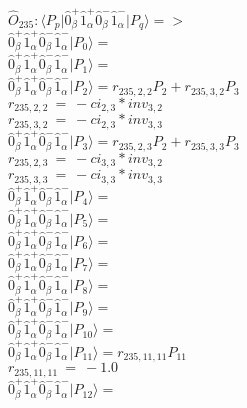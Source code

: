 \documentclass[14pt]{article}
\begin{document}
    $\hat{O}_{235}:  \langle{P_p}\vert \hat{0}_{\beta}^{+}\hat{1}_{\alpha}^{+}\hat{0}_{\beta}^{-}\hat{1}_{\alpha}^{-} \vert{P_q}\rangle => $ \\ 
    $ \hat{0}_{\beta}^{+}\hat{1}_{\alpha}^{+}\hat{0}_{\beta}^{-}\hat{1}_{\alpha}^{-} \vert{P_{0}}\rangle =  $ \\ 
    $ \hat{0}_{\beta}^{+}\hat{1}_{\alpha}^{+}\hat{0}_{\beta}^{-}\hat{1}_{\alpha}^{-} \vert{P_{1}}\rangle =  $ \\ 
    $ \hat{0}_{\beta}^{+}\hat{1}_{\alpha}^{+}\hat{0}_{\beta}^{-}\hat{1}_{\alpha}^{-} \vert{P_{2}}\rangle = {r}_{235,2,2}P_{2}+{r}_{235,3,2}P_{3} $ \\ 
    ${r}_{235,2,2}\ =\ -{ci}_{2,3}*{inv}_{3,2} $ \\ 
    ${r}_{235,3,2}\ =\ -{ci}_{2,3}*{inv}_{3,3} $ \\ 
    $ \hat{0}_{\beta}^{+}\hat{1}_{\alpha}^{+}\hat{0}_{\beta}^{-}\hat{1}_{\alpha}^{-} \vert{P_{3}}\rangle = {r}_{235,2,3}P_{2}+{r}_{235,3,3}P_{3} $ \\ 
    ${r}_{235,2,3}\ =\ -{ci}_{3,3}*{inv}_{3,2} $ \\ 
    ${r}_{235,3,3}\ =\ -{ci}_{3,3}*{inv}_{3,3} $ \\ 
    $ \hat{0}_{\beta}^{+}\hat{1}_{\alpha}^{+}\hat{0}_{\beta}^{-}\hat{1}_{\alpha}^{-} \vert{P_{4}}\rangle =  $ \\ 
    $ \hat{0}_{\beta}^{+}\hat{1}_{\alpha}^{+}\hat{0}_{\beta}^{-}\hat{1}_{\alpha}^{-} \vert{P_{5}}\rangle =  $ \\ 
    $ \hat{0}_{\beta}^{+}\hat{1}_{\alpha}^{+}\hat{0}_{\beta}^{-}\hat{1}_{\alpha}^{-} \vert{P_{6}}\rangle =  $ \\ 
    $ \hat{0}_{\beta}^{+}\hat{1}_{\alpha}^{+}\hat{0}_{\beta}^{-}\hat{1}_{\alpha}^{-} \vert{P_{7}}\rangle =  $ \\ 
    $ \hat{0}_{\beta}^{+}\hat{1}_{\alpha}^{+}\hat{0}_{\beta}^{-}\hat{1}_{\alpha}^{-} \vert{P_{8}}\rangle =  $ \\ 
    $ \hat{0}_{\beta}^{+}\hat{1}_{\alpha}^{+}\hat{0}_{\beta}^{-}\hat{1}_{\alpha}^{-} \vert{P_{9}}\rangle =  $ \\ 
    $ \hat{0}_{\beta}^{+}\hat{1}_{\alpha}^{+}\hat{0}_{\beta}^{-}\hat{1}_{\alpha}^{-} \vert{P_{10}}\rangle =  $ \\ 
    $ \hat{0}_{\beta}^{+}\hat{1}_{\alpha}^{+}\hat{0}_{\beta}^{-}\hat{1}_{\alpha}^{-} \vert{P_{11}}\rangle = {r}_{235,11,11}P_{11} $ \\ 
    ${r}_{235,11,11}\ =\ -1.0 $ \\ 
    $ \hat{0}_{\beta}^{+}\hat{1}_{\alpha}^{+}\hat{0}_{\beta}^{-}\hat{1}_{\alpha}^{-} \vert{P_{12}}\rangle =  $ \\ 
\end{document}
